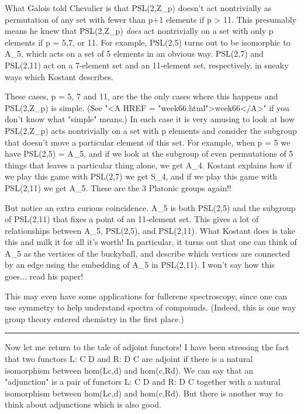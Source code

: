 What Galois told Chevalier is that PSL(2,Z_{p}) doesn't act
nontrivially as permutation of any set with fewer than p+1 elements if p
> 11.  This presumably means he knew that PSL(2,Z_{p})
\emph{does} act nontrivially on a set with only p elements if p = 5,7,
or 11.  For example, PSL(2,5) turns out to be isomorphic to
A_{5}, which acts on a set of 5 elements in an obvious way.
PSL(2,7) and PSL(2,11) act on a 7-element set and an 11-element set,
respectively, in sneaky ways which Kostant describes.

These cases, p = 5, 7 and 11, are the the only cases where this happens
and PSL(2,Z_{p}) is simple.  (See "<A HREF =
"week66.html">week66</A>" if you don't know what "simple"
means.)  In each case it is very amusing to look at how
PSL(2,Z_{p}) acts nontrivially on a set with p elements and
consider the subgroup that doesn't move a particular element of this set.  
For example, when p = 5 we have PSL(2,5) = A_{5}, and if we look at
the subgroup of even permutations of 5 things that leaves a particular
thing alone, we get A_{4}.  Kostant explains how if we play this
game with PSL(2,7) we get S_{4}, and if we play this game with
PSL(2,11) we get A_{5}.  These are the 3 Platonic groups again!!


But notice an extra curious coincidence.  A_{5} is both PSL(2,5)
and the subgroup of PSL(2,11) that fixes a point of an 11-element set.  
This gives a lot of relationships between A_{5}, PSL(2,5), 
and PSL(2,11).  What Kostant does is take this and milk it for all 
it's worth!  In particular, it turns out that one can think of A_{5} 
as the
vertices of the buckyball, and describe which vertices are connected by
an edge using the embedding of A_{5} in PSL(2,11).  I won't say
how this goes... read his paper!

This may even have some applications for fullerene spectroscopy, since
one can use symmetry to help understand spectra of compounds.  (Indeed,
this is one way group theory entered chemistry in the first place.)
\par\noindent\rule{\textwidth}{0.4pt}

Now let me return to the tale of adjoint functors!  I have been
stressing the fact that two functors L: C \to  D and R: D \to  C are
adjoint if there is a natural isomorphism between hom(Lc,d) and
hom(c,Rd).  We can say that an "adjunction" is a pair of
functors L: C \to  D and R: D \to  C together with a natural
isomorphism between hom(Lc,d) and hom(c,Rd).  But there is another way
to think about adjunctions which is also good.


